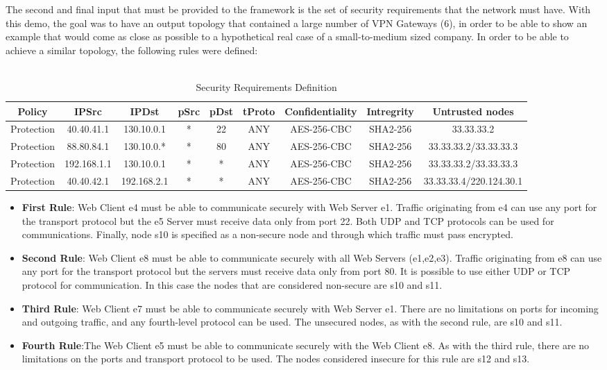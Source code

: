 The second and final input that must be provided to the framework is the set of security requirements that the network must have. With this demo, the goal was to have an output topology that contained a large number of VPN Gateways (6), in order to be able to show an example that would come as close as possible to a hypothetical real case of a small-to-medium sized company. In order to be able to achieve a similar topology, the following rules were defined:
\\
\\

\begin{table}[h]
    \centering
    \small
    \begin{tabular}{ccccccccc}
        \hline
         Policy & IPSrc & IPDst & pSrc & pDst & tProto & Confidentiality & Intregrity & Untrusted nodes\\
        \hline
        Protection & 40.40.41.1 & 130.10.0.1 & * & 22 & ANY & AES-256-CBC & SHA2-256 & 33.33.33.2 \\
        Protection & 88.80.84.1 & 130.10.0.* & * & 80 & ANY & AES-256-CBC & SHA2-256 & 33.33.33.2/33.33.33.3 \\
        Protection & 192.168.1.1 & 130.10.0.1 & * & * & ANY & AES-256-CBC & SHA2-256 & 33.33.33.2/33.33.33.3 \\
        Protection & 40.40.42.1 & 192.168.2.1 & * & * & ANY & AES-256-CBC & SHA2-256 & 33.33.33.4/220.124.30.1 \\
        \hline
    \end{tabular}
    \caption{Security Requirements Definition}
    \label{tab:tabella}
\end{table}
\begin{itemize}
    \item \textbf{First Rule}: Web Client e4 must be able to communicate securely with Web Server e1. Traffic originating from e4 can use any port for the transport protocol but the e5 Server must receive data only from port 22. Both UDP and TCP protocols can be used for communications. Finally, node s10 is specified as a non-secure node and through which traffic must pass encrypted.
    \item \textbf{Second Rule}: Web Client e8 must be able to communicate securely with all Web Servers (e1,e2,e3). Traffic originating from e8 can use any port for the transport protocol but the servers must receive data only from port 80. It is possible to use either UDP or TCP protocol for communication. In this case the nodes that are considered non-secure are s10 and s11.
    \item \textbf{Third Rule}: Web Client e7 must be able to communicate securely with Web Server e1. There are no limitations on ports for incoming and outgoing traffic, and any fourth-level protocol can be used. The unsecured nodes, as with the second rule, are s10 and s11. 
    \item \textbf{Fourth Rule}:The Web Client e5 must be able to communicate securely with the Web Client e8. As with the third rule, there are no limitations on the ports and transport protocol to be used. The nodes considered insecure for this rule are s12 and s13.
\end{itemize}


